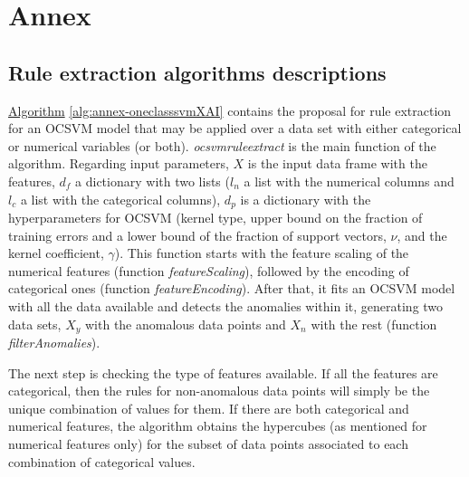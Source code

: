 \chapter{Annex}\label{ch:annex}

\section{Rule extraction algorithms descriptions}\label{sec:annex-rule-extraction}
\hyperref[alg:annex-oneclasssvmXAI]{Algorithm} \ref{alg:annex-oneclasssvmXAI} contains the proposal for rule extraction for an OCSVM model that may be applied over a data set with either categorical or numerical variables (or both).
\textit{ocsvm\textunderscore rule\textunderscore extract} is the main function of the algorithm. Regarding input parameters, $X$ is the input data frame with the features, $d_{f}$ a dictionary with two lists ($l_{n}$ a list with the numerical columns and $l_{c}$ a list with the categorical columns), $d_{p}$ is a dictionary with the hyperparameters for  OCSVM (kernel type, upper bound on the fraction of training errors and a lower bound of the fraction of support vectors, $\nu$, and the kernel coefficient, $\gamma$).
This function starts with the feature scaling of the numerical features (function \textit{featureScaling}), followed by the encoding of categorical ones (function \textit{featureEncoding}). After that, it fits an OCSVM model with all the data available and detects the anomalies within it, generating two data sets, $X_y$ with the anomalous data points and $X_n$ with the rest (function \textit{filterAnomalies}). 

The next step is checking the type of features available. If all the features are categorical, then the rules for non-anomalous data points will simply be the unique combination of values for them. If there are both categorical and numerical features, the algorithm obtains the hypercubes (as mentioned for numerical features only) for the subset of data points associated to each combination of categorical values. 

